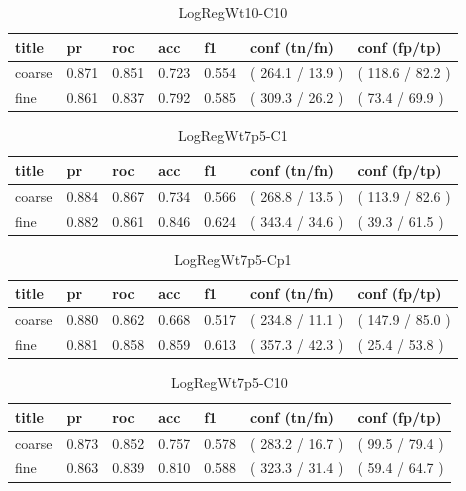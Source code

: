 \documentclass[ms]{nuthesis}
\begin{document}
\FloatBarrier
\begin{table}[h]
\centering
\begin{tabular}{|l||l||l||l||l||l||l|}\toprule
title & pr & roc & acc & f1 & conf (tn/fn) & conf (fp/tp) \\ \midrule
coarse & 0.871 & 0.851 & 0.723 & 0.554 & ( 264.1 / 13.9 ) & ( 118.6 / 82.2 ) \\
fine & 0.861 & 0.837 & 0.792 & 0.585 & ( 309.3 / 26.2 ) & ( 73.4 / 69.9 ) \\ \bottomrule
\end{tabular}
\caption{LogRegWt10-C10}
\label{tab:LogRegWt10-C10}
\end{table}
\FloatBarrier

\FloatBarrier
\begin{table}[h]
\centering
\begin{tabular}{|l||l||l||l||l||l||l|}\toprule
title & pr & roc & acc & f1 & conf (tn/fn) & conf (fp/tp) \\ \midrule
coarse & 0.884 & 0.867 & 0.734 & 0.566 & ( 268.8 / 13.5 ) & ( 113.9 / 82.6 ) \\
fine & 0.882 & 0.861 & 0.846 & 0.624 & ( 343.4 / 34.6 ) & ( 39.3 / 61.5 ) \\ \bottomrule
\end{tabular}
\caption{LogRegWt7p5-C1}
\label{tab:LogRegWt7p5-C1}
\end{table}
\FloatBarrier

\FloatBarrier
\begin{table}[h]
\centering
\begin{tabular}{|l||l||l||l||l||l||l|}\toprule
title & pr & roc & acc & f1 & conf (tn/fn) & conf (fp/tp) \\ \midrule
coarse & 0.880 & 0.862 & 0.668 & 0.517 & ( 234.8 / 11.1 ) & ( 147.9 / 85.0 ) \\
fine & 0.881 & 0.858 & 0.859 & 0.613 & ( 357.3 / 42.3 ) & ( 25.4 / 53.8 ) \\ \bottomrule
\end{tabular}
\caption{LogRegWt7p5-Cp1}
\label{tab:LogRegWt7p5-Cp1}
\end{table}
\FloatBarrier

\FloatBarrier
\begin{table}[h]
\centering
\begin{tabular}{|l||l||l||l||l||l||l|}\toprule
title & pr & roc & acc & f1 & conf (tn/fn) & conf (fp/tp) \\ \midrule
coarse & 0.873 & 0.852 & 0.757 & 0.578 & ( 283.2 / 16.7 ) & ( 99.5 / 79.4 ) \\
fine & 0.863 & 0.839 & 0.810 & 0.588 & ( 323.3 / 31.4 ) & ( 59.4 / 64.7 ) \\ \bottomrule
\end{tabular}
\caption{LogRegWt7p5-C10}
\label{tab:LogRegWt7p5-C10}
\end{table}
\FloatBarrier
\end{document}
